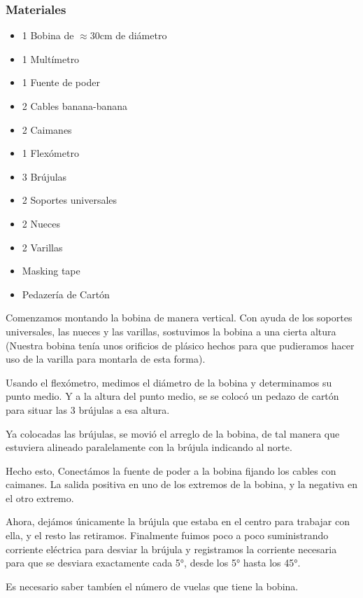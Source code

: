 \documentclass[article,12pt]{elsarticle}
\begin{document}
        \subsubsection{Materiales}
        \begin{itemize}
            \item 1 Bobina de $\approx$30cm de diámetro 
            \item 1 Multímetro
            \item 1 Fuente de poder
            \item 2 Cables banana-banana
            \item 2 Caimanes
            \item 1 Flexómetro
            \item 3 Brújulas
            \item 2 Soportes universales
            \item 2 Nueces
            \item 2 Varillas
            \item Masking tape
            \item Pedazería de Cartón
        \end{itemize}
        Comenzamos montando la bobina de manera vertical. Con ayuda de los soportes universales, las nueces y las varillas, sostuvimos la bobina a una cierta altura (Nuestra bobina tenía unos orificios de plásico hechos para que pudieramos hacer uso de la varilla para montarla de esta forma). 
        
        Usando el flexómetro, medimos el diámetro de la bobina y determinamos su punto medio. Y a la altura del punto medio, se se colocó un pedazo de cartón para situar las 3 brújulas a esa altura.

        Ya colocadas las brújulas, se movió el arreglo de la bobina, de tal manera que estuviera alineado paralelamente con la brújula indicando al norte.
    
        Hecho esto, Conectámos la fuente de poder a la bobina fijando los cables con caimanes. La salida positiva en uno de los extremos de la bobina, y la negativa en el otro extremo.
        
        Ahora, dejámos únicamente la brújula que estaba en el centro para trabajar con ella, y el resto las retiramos. Finalmente fuimos poco a poco suministrando corriente eléctrica para desviar la brújula y registramos la corriente necesaria para que se desviara exactamente cada 5°, desde los 5° hasta los 45°.

        Es necesario saber tambíen el número de vuelas que tiene la bobina.
\end{document}
